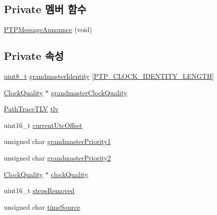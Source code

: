 \subsection*{Private 멤버 함수}
\begin{DoxyCompactItemize}
\item 
\hyperlink{class_p_t_p_message_announce_a0c29a3fa8d36a2ccdb248bbb7c433161}{P\+T\+P\+Message\+Announce} (void)
\end{DoxyCompactItemize}
\subsection*{Private 속성}
\begin{DoxyCompactItemize}
\item 
\hyperlink{stdint_8h_aba7bc1797add20fe3efdf37ced1182c5}{uint8\+\_\+t} \hyperlink{class_p_t_p_message_announce_aac45d13272e7f5bd9b06d2bf44c012af}{grandmaster\+Identity} \mbox{[}\hyperlink{windows__ipc_8hpp_afd1566058ed7927c2b790c9d4a0051ec}{P\+T\+P\+\_\+\+C\+L\+O\+C\+K\+\_\+\+I\+D\+E\+N\+T\+I\+T\+Y\+\_\+\+L\+E\+N\+G\+TH}\mbox{]}
\item 
\hyperlink{struct_clock_quality}{Clock\+Quality} $\ast$ \hyperlink{class_p_t_p_message_announce_aa67cf6cb88ed67b2850993312a7cd5f2}{grandmaster\+Clock\+Quality}
\item 
\hyperlink{class_path_trace_t_l_v}{Path\+Trace\+T\+LV} \hyperlink{class_p_t_p_message_announce_ac7b185260086ad357ff7a9c29f468936}{tlv}
\item 
uint16\+\_\+t \hyperlink{class_p_t_p_message_announce_a4ee8eca04b1ccd7d8eaae5f0dd3a11fa}{current\+Utc\+Offset}
\item 
unsigned char \hyperlink{class_p_t_p_message_announce_a93988c82dd819cc976c32f9e006b97e3}{grandmaster\+Priority1}
\item 
unsigned char \hyperlink{class_p_t_p_message_announce_a1e9e3c7867bf9eb557e5cf6edbd7f54a}{grandmaster\+Priority2}
\item 
\hyperlink{struct_clock_quality}{Clock\+Quality} $\ast$ \hyperlink{class_p_t_p_message_announce_ab34e3b1a4a03f5cf7db079194cea2bf3}{clock\+Quality}
\item 
uint16\+\_\+t \hyperlink{class_p_t_p_message_announce_ab24df4cccbede4b07586878ef0d47395}{steps\+Removed}
\item 
unsigned char \hyperlink{class_p_t_p_message_announce_a56fd97f48cb931b2450032650f82ef17}{time\+Source}
\end{DoxyCompactItemize}
